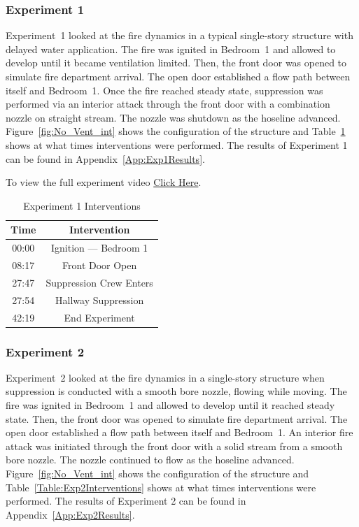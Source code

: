 \documentclass[12pt,oneside]{book}
\begin{document}
\subsubsection{Experiment 1}
Experiment~1 looked at the fire dynamics in a typical single-story structure with delayed water application. The fire was ignited in Bedroom~1 and allowed to develop until it became ventilation limited. Then, the front door was opened to simulate fire department arrival. The open door established a flow path between itself and Bedroom~1. Once the fire reached steady state, suppression was performed via an interior attack through the front door with a combination nozzle on straight stream. The nozzle was shutdown as the hoseline advanced. Figure~\ref{fig:No_Vent_int} shows the configuration of the structure and Table~\ref{Table:Exp1Interventions} shows at what times interventions were performed. The results of Experiment 1 can be found in Appendix~\ref{App:Exp1Results}. 

To view the full experiment video \href{https://player.vimeo.com/video/170499605?autoplay=1}{Click Here}.

\begin{table}[!ht]
	\centering
	\caption{Experiment 1 Interventions}
	\begin{tabular}{|c|c|} 
		\hline
		Time & Intervention \\ \hline \hline
		00:00 & Ignition --- Bedroom 1 \\ \hline
		08:17 & Front Door Open \\ \hline
		27:47 & Suppression Crew Enters\\ \hline
		27:54 & Hallway Suppression \\ \hline
		42:19 & End Experiment\\ \hline
	\end{tabular}
	\label{Table:Exp1Interventions}
\end{table}

\FloatBarrier

\subsubsection{Experiment 2}

Experiment~2 looked at the fire dynamics in a single-story structure when suppression is conducted with a smooth bore nozzle, flowing while moving. The fire was ignited in Bedroom~1 and allowed to develop until it reached steady state. Then, the front door was opened to simulate fire department arrival. The open door established a flow path between itself and Bedroom~1. An interior fire attack was initiated through the front door with a solid stream from a smooth bore nozzle. The nozzle continued to flow as the hoseline advanced. Figure~\ref{fig:No_Vent_int} shows the configuration of the structure and Table~\ref{Table:Exp2Interventions} shows at what times interventions were performed. The results of Experiment 2 can be found in Appendix~\ref{App:Exp2Results}. 
\end{document}
